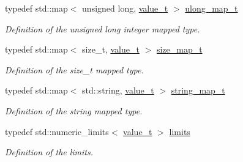 \begin{DoxyCompactItemize}
typedef std\+::map$<$ unsigned long, \hyperlink{struct_d_d4hep_1_1_primitive_a0639e73bb8f07f99c2d8401f807a7af6}{value\+\_\+t} $>$ \hyperlink{struct_d_d4hep_1_1_primitive_ab4ba00823c6afd9907a1d53af783d2fe}{ulong\+\_\+map\+\_\+t}
\begin{DoxyCompactList}\small\item\em Definition of the unsigned long integer mapped type. \end{DoxyCompactList}\item 
typedef std\+::map$<$ size\+\_\+t, \hyperlink{struct_d_d4hep_1_1_primitive_a0639e73bb8f07f99c2d8401f807a7af6}{value\+\_\+t} $>$ \hyperlink{struct_d_d4hep_1_1_primitive_af954a6789fd528d13e6533a4bdb3aa21}{size\+\_\+map\+\_\+t}
\begin{DoxyCompactList}\small\item\em Definition of the size\+\_\+t mapped type. \end{DoxyCompactList}\item 
typedef std\+::map$<$ std\+::string, \hyperlink{struct_d_d4hep_1_1_primitive_a0639e73bb8f07f99c2d8401f807a7af6}{value\+\_\+t} $>$ \hyperlink{struct_d_d4hep_1_1_primitive_a27b9d11befb4af57c39af66b69efdbb4}{string\+\_\+map\+\_\+t}
\begin{DoxyCompactList}\small\item\em Definition of the string mapped type. \end{DoxyCompactList}\item 
typedef std\+::numeric\+\_\+limits$<$ \hyperlink{struct_d_d4hep_1_1_primitive_a0639e73bb8f07f99c2d8401f807a7af6}{value\+\_\+t} $>$ \hyperlink{struct_d_d4hep_1_1_primitive_a9f6d14410388a5c8067d274030dbdc3c}{limits}
\begin{DoxyCompactList}\small\item\em Definition of the limits. \end{DoxyCompactList}\end{DoxyCompactItemize}
